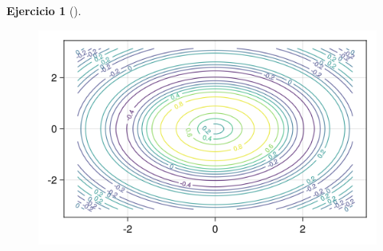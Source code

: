 \documentclass[
  a4paper,
]{scrreport}
\theoremstyle{definition}
\newtheorem{exercise}{Ejercicio}[chapter]
\theoremstyle{remark}
\begin{document}
\begin{exercise}[]
\begin{enumerate}
\begin{tcolorbox}
  \begin{figure}[H]

  {\centering \includegraphics{09-derivadas-funciones-varias-variables_files/figure-pdf/cell-14-output-1.png}

  }

  \end{figure}

  \end{tcolorbox}
\end{enumerate}

\end{exercise}
\end{document}
